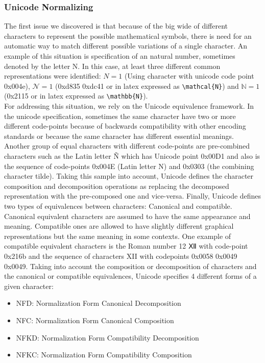\subsubsection{Unicode Normalizing} 
The first issue we discovered is that because of the big wide of different characters to represent the possible mathematical symbols, there is need for an automatic way to match different possible variations of a single character. An example of this situation is specification of an natural number, sometimes denoted by the letter N. In this case, at least three different common representations were identified: $ N = 1 $ (Using character with unicode code point 0x004e), $\mathcal{N} = 1$ (0xd835 0xdc41 or in latex expressed as \lstinline|\mathcal{N}|) and $\mathbb{N} = 1$ (0x2115 or in latex expressed as \lstinline|\mathbb{N}|). \\
  For addressing this situation, we rely on the Unicode equivalence framework. In the unicode specification, sometimes the same character have two or more different code-points because of backwards compatibility with other encoding standards or because the same character has different essential meanings. Another group of equal characters with different code-points are pre-combined characters such as the Latin letter \~{N} which has Unicode point 0x00D1 and also is the sequence of code-points  0x004E (Latin letter N) and 0x0303 (the combining character tilde). Taking this sample into account, Unicode defines the character composition and decomposition operations as replacing the decomposed representation with the pre-composed one and vice-versa. Finally, Unicode defines two types of equivalences between characters: Canonical and compatible. Canonical equivalent characters are assumed to have the same appearance and meaning. Compatible ones are allowed to have slightly different graphical representations but the same meaning in some contexts. One example of compatible equivalent characters is the Roman number 12 {\unicodefontⅫ} with code-point 0x216b and the sequence of characters XII with codepoints 0x0058 0x0049 0x0049. Taking into account the composition or decomposition of characters and the canonical or compatible equivalences, Unicode specifies 4 different forms of a given character:
  \begin{itemize}
  \item NFD: Normalization Form Canonical Decomposition
  \item NFC: Normalization Form Canonical Composition
  \item NFKD: Normalization Form Compatibility Decomposition
  \item NFKC: Normalization Form Compatibility Composition
  \end{itemize}
  
